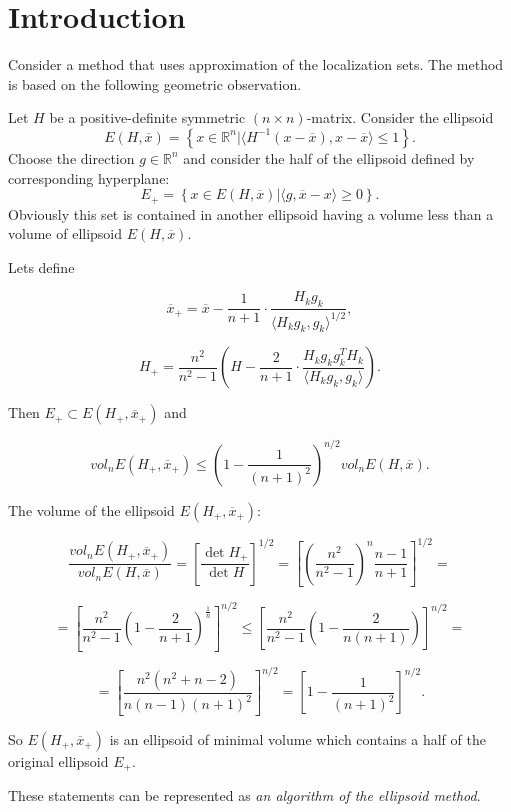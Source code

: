 \documentclass[runningheads,a4paper]{llncs}
\begin{document}
\section{Introduction}

Consider a method that uses approximation of the localization sets. The method is based on the following geometric observation.

Let $H$ be a positive-definite symmetric $(n\times n)$-matrix. Consider the ellipsoid $$E(H,\overline{x})=\left\{x\in\mathbb{R}^n|\langle H^{-1}(x-\overline{x}),x-\overline{x}\rangle\leq 1\right\}.$$ Choose the direction $g\in\mathbb{R}^n$ and consider the half of the ellipsoid defined by corresponding hyperplane: $$E_+=\left\{x\in E(H,\overline{x})|\langle g,\overline{x}-x\rangle\geq 0\right\}.$$ Obviously this set is contained in another ellipsoid having a volume less than a volume of ellipsoid $E(H,\overline{x})$.

\begin{lemma}
\proof\cite{nesterov}
Lets define

$$
\overline{x}_+=\overline{x}-\frac{1}{n+1}\cdot\frac{H_kg_k}{\langle H_kg_k,g_k\rangle^{1/2}},
$$

$$
H_+=\frac{n^2}{n^2-1}\left(H-\frac{2}{n+1}\cdot\frac{H_kg_kg_k^TH_k}{\langle H_kg_k,g_k\rangle}\right).
$$

Then $E_+\subset E(H_+,\overline{x}_+)$ and

$$
vol_nE(H_+,\overline{x}_+)\leq\left(1-\frac{1}{(n+1)^2}\right)^{n/2}vol_nE(H,\overline{x}).
$$

\end{lemma}

The volume of the ellipsoid $E(H_+,\overline{x}_+)$:

$$
\frac{vol_nE(H_+,\overline{x}_+)}{vol_nE(H,\overline{x})}=\left[\frac{\det H_+}{\det H}\right]^{1/2}=\left[\left(\frac{n^2}{n^2-1}\right)^n\frac{n-1}{n+1}\right]^{1/2}=
$$

$$
=\left[\frac{n^2}{n^2-1}\left(1-\frac{2}{n+1}\right)^\frac{1}{n}\right]^{n/2}\leq\left[\frac{n^2}{n^2-1}\left(1-\frac{2}{n(n+1)}\right)\right]^{n/2}=
$$

$$
=\left[\frac{n^2(n^2+n-2)}{n(n-1)(n+1)^2}\right]^{n/2}=\left[1-\frac{1}{(n+1)^2}\right]^{n/2}.
$$

So $E(H_+,\overline{x}_+)$ is an ellipsoid of minimal volume which contains a half of the original ellipsoid $E_+$.

These statements can be represented as \textit{an algorithm of the ellipsoid method}.
\end{document}

